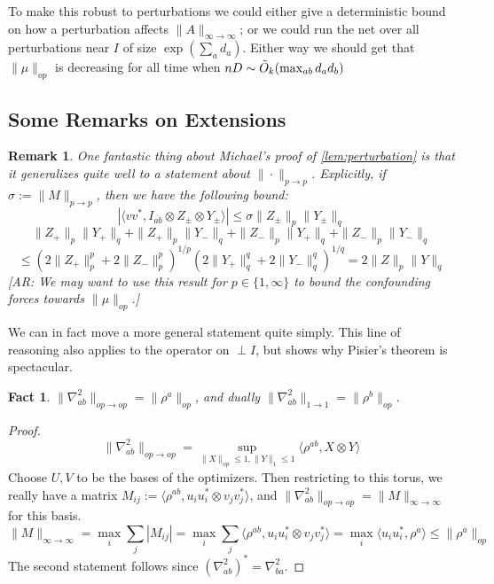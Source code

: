 \documentclass{article}
\newtheorem{fact}[theorem]{Fact}
\newtheorem{remark}{Remark}
\newcommand{\AR}[1]{{\color{orange}[AR: #1]}}
\begin{document}
To make this robust to perturbations we could either give a deterministic bound on how a perturbation affects $\|A\|_{\infty \to \infty}$; or we could run the net over all perturbations near $I$ of size $\exp( \sum_{a} d_{a} )$. Either way we should get that $\|\mu\|_{op}$ is decreasing for all time when $nD \sim \Tilde{O}_{k}(\max_{ab} d_{a} d_{b} )$


\subsection{Some Remarks on Extensions}

\begin{remark}
One fantastic thing about Michael's proof of \cref{lem:perturbation} is that it generalizes quite well to a statement about $\|\cdot\|_{p \to p}$. Explicitly, if $\sigma := \|M\|_{p \to p}$, then we have the following bound:
\[ |\langle v v^{*}, I_{\overline{ab}} \otimes Z_{\pm} \otimes Y_{\pm} \rangle| \leq \sigma \|Z_{\pm} \|_{p} \|Y_{\pm} \|_{q}    \]
\[ \|Z_{+}\|_{p} \|Y_{+}\|_{q} + \|Z_{+}\|_{p} \|Y_{-}\|_{q} + \|Z_{-}\|_{p} \|Y_{+}\|_{q} + \|Z_{-}\|_{p} \|Y_{-}\|_{q} \]
\[ \leq (2 \|Z_{+}\|_{p}^{p} + 2 \|Z_{-}\|_{p}^{p})^{1/p} (2 \|Y_{+}\|_{q}^{q} + 2 \|Y_{-}\|_{q}^{q})^{1/q} = 2 \|Z\|_{p} \|Y\|_{q}    \]
\AR{We may want to use this result for $p \in \{1,\infty\}$ to bound the confounding forces towards $\|\mu\|_{op}$.} 
\end{remark}

We can in fact move a more general statement quite simply. This line of reasoning also applies to the operator on $\perp I$, but shows why Pisier's theorem is spectacular. 

\begin{fact}
$\|\nabla_{ab}^{2}\|_{op \to op} = \|\rho^{a}\|_{op}$, and dually $\|\nabla_{ab}^{2}\|_{1 \to 1} = \|\rho^{b}\|_{op}$. 
\end{fact}
\begin{proof}
\[ \|\nabla_{ab}^{2}\|_{op \to op} = \sup_{\|X\|_{op} \leq 1, \|Y\|_{1} \leq 1} \langle \rho^{ab}, X \otimes Y \rangle  \]
Choose $U,V$ to be the bases of the optimizers. Then restricting to this torus, we really have a matrix $M_{ij} := \langle \rho^{ab}, u_{i} u_{i}^{*} \otimes v_{j} v_{j}^{*} \rangle$, and $\|\nabla_{ab}^{2}\|_{op \to op} = \|M\|_{\infty \to \infty}$ for this basis. 
\[ \|M\|_{\infty \to \infty} = \max_{i} \sum_{j} |M_{ij}| = \max_{i} \sum_{j} \langle \rho^{ab}, u_{i} u_{i}^{*} \otimes v_{j} v_{j}^{*} \rangle = \max_{i} \langle u_{i} u_{i}^{*}, \rho^{a} \rangle \leq \|\rho^{a}\|_{op}   \]
The second statement follows since $(\nabla_{ab}^{2})^{*} = \nabla_{ba}^{2}$. 
\end{proof}
\end{document}
